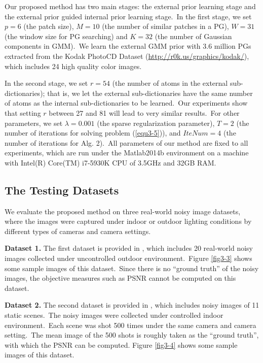 Our proposed method has two main stages: the external prior learning stage and the external prior guided internal prior learning stage.\ In the first stage, we set $p = 6$ (the patch size), $M = 10$ (the number of similar patches in a PG), $W = 31$ (the window size for PG searching) and $K = 32$ (the number of Gaussian components in GMM).\ We learn the external GMM prior with 3.6 million PGs extracted from the Kodak PhotoCD Dataset (\url{http://r0k.us/graphics/kodak/}), which includes 24 high quality color images. 

In the second stage, we set $r = 54$ (the number of atoms in the external sub-dictionaries); that is, we let the external sub-dictionaries have the same number of atoms as the internal sub-dictionaries to be learned.\ Our experiments show that setting $r$ between 27 and 81 will lead to very similar results.\ For other parameters, we set $\lambda=0.001$ (the sparse regularization parameter), $T = 2$ (the number of iterations for solving problem (\ref{equ3-5})), and $IteNum = 4$ (the number of iterations for Alg. 2).\ All parameters of our method are fixed to all experiments, which are run under the Matlab2014b environment on a machine with Intel(R) Core(TM) i7-5930K CPU of 3.5GHz and 32GB RAM.

\subsection{The Testing Datasets}

We evaluate the proposed method on three real-world noisy image datasets, where the images were captured under indoor or outdoor lighting conditions by different types of cameras and camera settings. 

\textbf{Dataset 1.} The first dataset is provided in \cite{ncwebsite}, which includes 20 real-world noisy images collected under uncontrolled outdoor environment.\ Figure \ref{fig3-3} shows some sample images of this dataset.\ Since there is no ``ground truth'' of the noisy images, the objective measures such as PSNR cannot be computed on this dataset. 

\textbf{Dataset 2.} The second dataset is provided in \cite{crosschannel2016}, which includes noisy images of 11 static scenes.\ The noisy images were collected under controlled indoor environment.\ Each scene was shot 500 times under the same camera and camera setting.\ The mean image of the 500 shots is roughly taken as the ``ground truth'', with which the PSNR can be computed. Figure \ref{fig3-4} shows some sample images of this dataset. 

